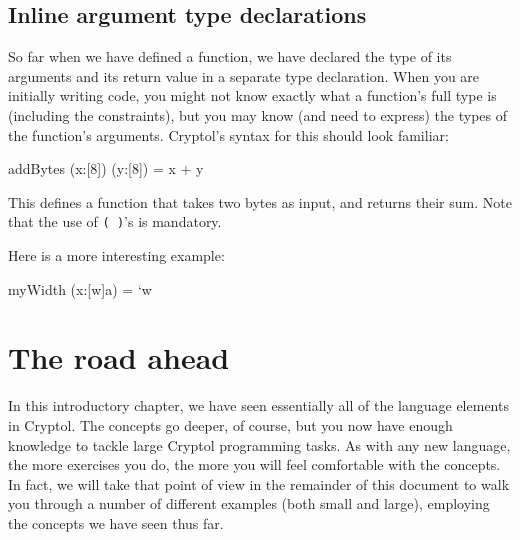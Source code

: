 
\subsection{Inline argument type declarations}\indTypeInline
\label{sec:inline-argument-type}

So far when we have defined a function, we have declared the type of
its arguments and its return value in a separate type declaration.
When you are initially writing code, you might not know exactly what a
function's full type is (including the constraints), but you may know
(and need to express) the types of the function's arguments. Cryptol's
syntax for this should look familiar:
\begin{code}
  addBytes (x:[8]) (y:[8]) = x + y
\end{code}

This defines a function that takes two bytes as input, and returns their sum.
Note that the use of {\tt( )}'s is mandatory.

Here is a more interesting example:
\begin{code}
  myWidth (x:[w]a) = `w
\end{code}


\section{The road ahead}
\label{sec:road-ahead}

In this introductory chapter, we have seen essentially all of the
language elements in Cryptol. The concepts go deeper, of course, but
you now have enough knowledge to tackle large Cryptol programming
tasks. As with any new language, the more exercises you do, the more
you will feel comfortable with the concepts. In fact, we will take
that point of view in the remainder of this document to walk you
through a number of different examples (both small and large),
employing the concepts we have seen thus far.

